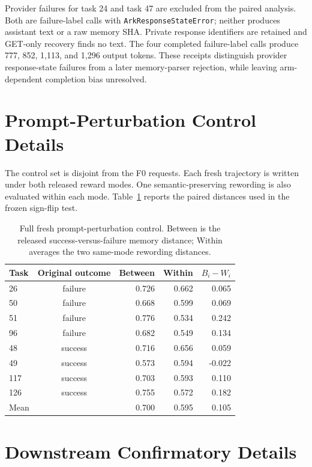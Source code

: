 Provider failures for task 24 and task 47 are excluded from the paired analysis. Both are failure-label calls with \texttt{ArkResponseStateError}; neither produces assistant text or a raw memory SHA. Private response identifiers are retained and GET-only recovery finds no text. The four completed failure-label calls produce 777, 852, 1,113, and 1,296 output tokens. These receipts distinguish provider response-state failures from a later memory-parser rejection, while leaving arm-dependent completion bias unresolved.

\section{Prompt-Perturbation Control Details}
The control set is disjoint from the F0 requests. Each fresh trajectory is written under both released reward modes. One semantic-preserving rewording is also evaluated within each mode. Table~\ref{tab:prompt-control-full} reports the paired distances used in the frozen sign-flip test.

\begin{table}[h]
\centering
\caption{Full fresh prompt-perturbation control. Between is the released success-versus-failure memory distance; Within averages the two same-mode rewording distances.}
\label{tab:prompt-control-full}
\scriptsize
\begin{tabular}{lcrrr}
\toprule
Task & Original outcome & Between & Within & $B_i-W_i$ \\
\midrule
26  & failure & 0.726 & 0.662 & 0.065 \\
50  & failure & 0.668 & 0.599 & 0.069 \\
51  & failure & 0.776 & 0.534 & 0.242 \\
96  & failure & 0.682 & 0.549 & 0.134 \\
48  & success & 0.716 & 0.656 & 0.059 \\
49  & success & 0.573 & 0.594 & -0.022 \\
117 & success & 0.703 & 0.593 & 0.110 \\
126 & success & 0.755 & 0.572 & 0.182 \\
\midrule
Mean & & 0.700 & 0.595 & 0.105 \\
\bottomrule
\end{tabular}
\end{table}

\section{Downstream Confirmatory Details}
